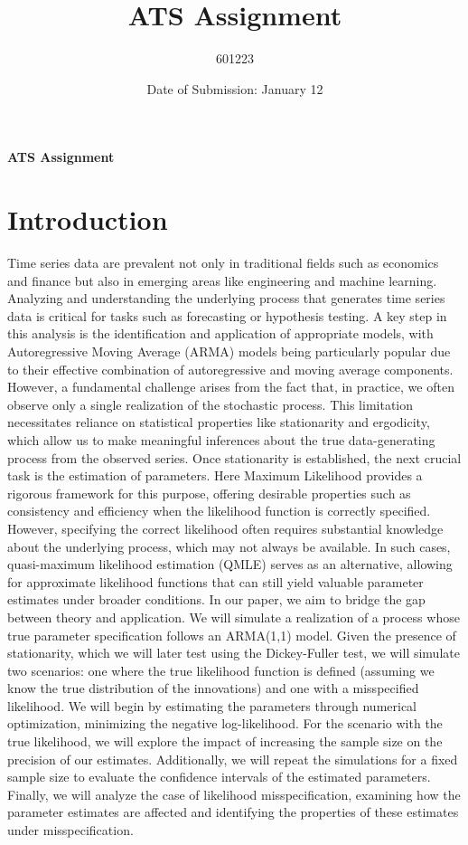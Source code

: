 \documentclass[12pt]{article}
\begin{document}
\clearpage
\title{ATS Assignment}
\author{601223}
\date{Date of Submission: January 12}

\begin{titlepage}
\textbf{\Large ATS Assignment}
\end{titlepage}

\tableofcontents

\newpage

\section{Introduction}
Time series data are prevalent not only in traditional fields such as economics and finance but also in emerging areas like engineering and machine learning. 
Analyzing and understanding the underlying process that generates time series data is critical for tasks such as forecasting or hypothesis testing.
A key step in this analysis is the identification and application of appropriate models, with Autoregressive Moving Average (ARMA) models being particularly popular due to their effective combination of autoregressive and moving average components.
However, a fundamental challenge arises from the fact that, in practice, we often observe only a single realization of the stochastic process. This limitation necessitates reliance on statistical properties like stationarity and ergodicity, which allow us to make meaningful inferences about the true data-generating process from the observed series.
Once stationarity is established, the next crucial task is the estimation of parameters. Here Maximum Likelihood provides a rigorous framework for this purpose, offering desirable properties such as consistency and efficiency when the likelihood function is correctly specified. However, specifying the correct likelihood often requires substantial knowledge about the underlying process, which may not always be available. In such cases, quasi-maximum likelihood estimation (QMLE) serves as an alternative, allowing for approximate likelihood functions that can still yield valuable parameter estimates under broader conditions.
In our paper, we aim to bridge the gap between theory and application.
We will simulate a realization of a process whose true parameter specification follows an ARMA(1,1) model. Given the presence of stationarity, which we will later test using the Dickey-Fuller test, we will simulate two scenarios: one where the true likelihood function is defined (assuming we know the true distribution of the innovations) and one with a misspecified likelihood.
We will begin by estimating the parameters through numerical optimization, minimizing the negative log-likelihood. For the scenario with the true likelihood, we will explore the impact of increasing the sample size on the precision of our estimates. Additionally, we will repeat the simulations for a fixed sample size to evaluate the confidence intervals of the estimated parameters.
Finally, we will analyze the case of likelihood misspecification, examining how the parameter estimates are affected and identifying the properties of these estimates under misspecification.
\end{document}
